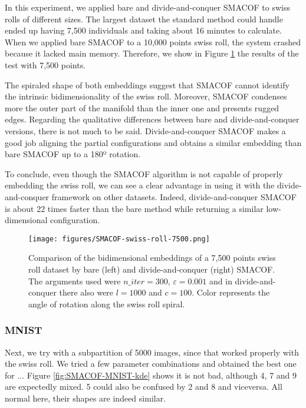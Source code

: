 In this experiment, we applied bare and divide-and-conquer SMACOF to swiss rolls of different sizes. The largest dataset the standard method could handle ended up having 7,500 individuals and taking about 16 minutes to calculate. When we applied bare SMACOF to a 10,000 points swiss roll, the system crashed because it lacked main memory. Therefore, we show in Figure \ref{fig:SMACOF-swiss-roll-7500} the results of the test with 7,500 points.

The spiraled shape of both embeddings suggest that SMACOF cannot identify the intrinsic bidimensionality of the swiss roll. Moreover, SMACOF condenses more the outer part of the manifold than the inner one and presents rugged edges. Regarding the qualitative differences between bare and divide-and-conquer versions, there is not much to be said. Divide-and-conquer SMACOF makes a good job aligning the partial configurations and obtains a similar embedding than bare SMACOF up to a 180º rotation.

To conclude, even though the SMACOF algorithm is not capable of properly embedding the swiss roll, we can see a clear advantage in using it with the divide-and-conquer framework on other datasets. Indeed, divide-and-conquer SMACOF is about 22 times faster than the bare method while returning a similar low-dimensional configuration.

\begin{figure}[ht]
    \centering
    \texttt{[image: figures/SMACOF-swiss-roll-7500.png]}
    \caption{Comparison of the bidimensional embeddings of a 7,500 points swiss roll dataset \citep{Spiwokv2007} by bare (left) and divide-and-conquer (right) SMACOF. The arguments used were $n\_iter = 300,\, \varepsilon = 0.001$ and in divide-and-conquer there also were $l=1000$ and $c=100$. Color represents the angle of rotation along the swiss roll spiral.}
    \label{fig:SMACOF-swiss-roll-7500}
\end{figure}


\subsubsection{MNIST}



Next, we try with a subpartition of 5000 images, since that worked properly with the swiss roll. We tried a few parameter combinations and obtained the best one for ... Figure \ref{fig:SMACOF-MNIST-kde} shows it is not bad, although 4, 7 and 9 are expectedly mixed. 5 could also be confused by 2 and 8 and viceversa. All normal here, their shapes are indeed similar.

